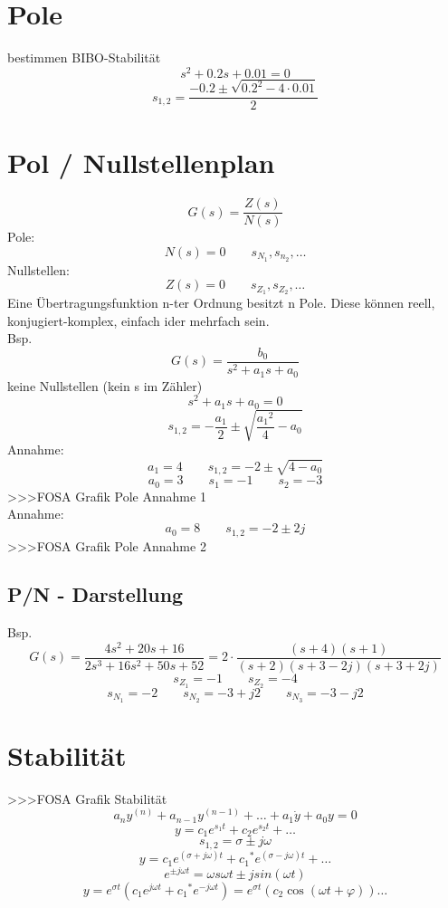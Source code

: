 \section{Pole}
bestimmen BIBO-Stabilität
\[ s^2 + 0.2 s + 0.01 = 0 \]
\[ s_{1,2} = \frac{-0.2 \pm \sqrt{0.2^2 - 4 \cdot 0.01}}{2} \]

\section{Pol / Nullstellenplan}
\[ G(s) = \frac{Z(s)}{N(s)} \]
Pole: 
\[ N(s) = 0 \qquad s_{N_1}, s_{n_2}, \ldots \]
Nullstellen: 
\[ Z(s) = 0 \qquad s_{Z_1}, s_{Z_2}, \ldots \]
Eine Übertragungsfunktion n-ter Ordnung besitzt n Pole. Diese können reell, 
konjugiert-komplex, einfach ider mehrfach sein. \\
Bsp. 
\[ G(s) = \frac{b_0}{s^2 + a_1 s + a_0} \]
keine Nullstellen (kein s im Zähler)\\
\[ s^2 + a_1 s + a_0 = 0 \]
\[ s_{1, 2} = -\frac{a_1}{2} \pm \sqrt{\frac{{a_1}^2}{4} - a_0} \]
Annahme: 
\[ a_1 = 4 \qquad s_{1, 2} = -2 \pm \sqrt{4 - a_0} \]
\[ a_0 = 3 \qquad s_1 = - 1 \qquad s_2 = -3 \]
>>>FOSA Grafik Pole Annahme 1\\
Annahme: 
\[ a_0 = 8 \qquad s_{1, 2} = -2 \pm 2 j \]
>>>FOSA Grafik Pole Annahme 2\\
\subsection{P/N - Darstellung}
Bsp. 
\[ G(s) = \frac{4 s^2 + 20s + 16}{2 s^3 + 16 s^2 + 50 s + 52} 
= 2 \cdot \frac{(s+4)(s+1)}{(s+2)(s+3-2j)(s+3+2j)} \]
\[ s_{Z_1} = -1 \qquad s_{Z_2} = -4 \]
\[ s_{N_1} = -2 \qquad s_{N_2} = -3 + j 2 \qquad s_{N_3} = -3 - j 2 \]

\section{Stabilität}
>>>FOSA Grafik Stabilität
\[ a_n y^{(n)} + a_{n-1} y^(n-1) + \ldots + a_1 \dot{y} + a_0 y = 0 \]
\[ y = c_1 e^{s_1 t} + c_2 e^{s_2 t} + \ldots \]
\[ s_{1, 2} = \sigma \pm j \omega \]
\[ y = c_1 e^{(\sigma + j \omega)t} + {c_1}^* e^{(\sigma - j \omega)t} + \ldots \]
\[ e^{\pm j \omega t} = \omega s \omega t \pm j sin(\omega t) \]
\[ y = e^{\sigma t}(c_1 e^{j \omega t} + {c_1}^* e^{-j \omega t}) 
= e^{\sigma t}(c_2 \cos(\omega t + \varphi))\ldots \]

